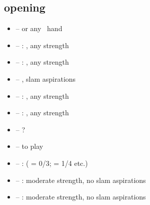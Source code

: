\subsection{\ctr{1\nt} opening}
\label{subsec:1nt-op}

\begin{itemize}
  \item \ctr{2\c} -- \hyperref[subsec:stayman]{}  or any \inv\ hand
  \item \ctr{2\d} -- : , any strength
  \item \ctr{2\h} -- : , any strength
  \item \ctr{2\s} -- \hyperref[subsec:minor-stayman]{} , slam aspirations
  \item \ctr{2\nt} -- : , any strength
  \item \ctr{3\c} -- : , any strength
  \item \ctr{3\d/\major} -- ?
  \item \ctr{3\nt} -- \nat\/ to play
  \item \ctr{4\c} -- :  ( = 0/3;  = 1/4 etc.)
  \item \ctr{4\d} -- :  moderate strength, no slam aspirations
  \item \ctr{4\h} -- :  moderate strength, no slam aspirations
\end{itemize}
